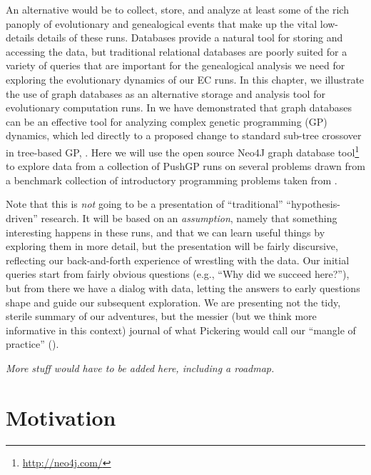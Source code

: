 An alternative would be to collect, store, and analyze at least some of the rich panoply of 
evolutionary and genealogical events that make up the vital low-details details of these runs. 
Databases provide a natural tool for 
storing and accessing the data, but traditional relational
databases are poorly suited for a variety of queries that are important for the genealogical analysis
we need for exploring the evolutionary dynamics of our EC runs.  %
In this chapter, we illustrate the use of graph databases as an alternative storage and analysis tool for
evolutionary computation runs. In \cite{donatuccianalysis} we have demonstrated that graph databases
can be an effective tool for analyzing complex genetic programming (GP) dynamics, which led directly
to a proposed change to standard sub-tree crossover in tree-based GP, \cite{mcphee:GECCO15}.
Here we will use the open source Neo4J graph database tool\footnote{\url{http://neo4j.com/}} 
to explore data from a
collection of PushGP runs on several problems drawn from a benchmark collection of introductory 
programming problems taken from \cite{helmuth:GECCO15}.

Note that this is \emph{not} going to be a presentation of ``traditional'' ``hypothesis-driven'' 
research. It will be based on an \emph{assumption}, namely that something interesting happens in
these runs, and that we can learn useful things by exploring them in more detail, but the presentation
will be fairly discursive, reflecting our back-and-forth experience of wrestling with the data. Our
initial queries start from fairly obvious questions (e.g., ``Why did we succeed here?''), but from
there we have a dialog with data, letting the answers to early questions shape and guide our 
subsequent exploration. We are presenting not the tidy, sterile summary of our adventures, but
the messier (but we think more informative in this context) journal of what Pickering would call
our ``mangle of practice'' (\cite{smith2008mangle, pickering:AJS:1993}).

\emph{More stuff would have to be added here, including a roadmap.}

\section{Motivation}
\label{sec:motivation}

